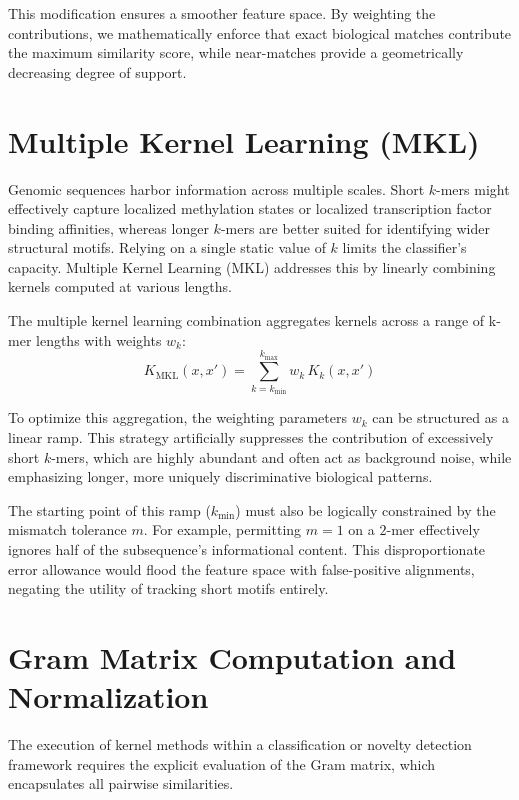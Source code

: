 This modification ensures a smoother feature space. By weighting the contributions, we mathematically enforce that exact biological matches contribute the maximum similarity score, while near-matches provide a geometrically decreasing degree of support.

\section{Multiple Kernel Learning (MKL)}\label{sec:mkl}

Genomic sequences harbor information across multiple scales. Short $k$-mers might effectively capture localized methylation states or localized transcription factor binding affinities, whereas longer $k$-mers are better suited for identifying wider structural motifs. Relying on a single static value of $k$ limits the classifier's capacity. Multiple Kernel Learning (MKL) addresses this by linearly combining kernels computed at various lengths.

\begin{definizione}\label{def:mkl}
The multiple kernel learning combination aggregates kernels across a range of k-mer lengths with weights $w_k$:
\begin{equation}\label{eq:mkl}
K_{\text{MKL}}(x, x') = \sum_{k=k_{\min}}^{k_{\max}} w_k \, K_k(x, x')
\end{equation}
\end{definizione}

To optimize this aggregation, the weighting parameters $w_k$ can be structured as a linear ramp. This strategy artificially suppresses the contribution of excessively short $k$-mers, which are highly abundant and often act as background noise, while emphasizing longer, more uniquely discriminative biological patterns.

The starting point of this ramp ($k_{\min}$) must also be logically constrained by the mismatch tolerance $m$. For example, permitting $m=1$ on a $2$-mer effectively ignores half of the subsequence's informational content. This disproportionate error allowance would flood the feature space with false-positive alignments, negating the utility of tracking short motifs entirely.

\section{Gram Matrix Computation and Normalization}\label{sec:gram}

The execution of kernel methods within a classification or novelty detection framework requires the explicit evaluation of the Gram matrix, which encapsulates all pairwise similarities. 

